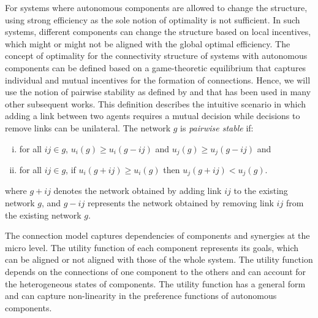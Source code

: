 \documentclass[journal,onecolumn]{IEEEtran}
\theoremstyle{plain}
\begin{document}
For systems where autonomous components are allowed to change the structure, using strong efficiency as the sole notion of optimality is not sufficient. In such systems, different components can change the structure based on local incentives, which might or might not be aligned with the global optimal efficiency. The concept of optimality for the connectivity structure of systems with autonomous components can be defined based on a game-theoretic equilibrium that captures individual and mutual incentives for the formation of connections. Hence, we will use the notion of pairwise stability as defined by \cite{jackson1996strategic} and that has been used in many other subsequent works. This definition describes the intuitive scenario in which adding a link between two agents requires a mutual decision while decisions to remove links can be unilateral.
The network $g$ is \textit{pairwise stable} if:

\begin{enumerate}[(i)]
\item for all $ij \in g$, $u_i(g) \geq u_i(g - ij)$ and $u_j(g) \geq u_j(g - ij)$ and
\item for all $ij \in g$, if $u_i(g + ij) \geq u_i(g)$ then $u_j(g + ij) < u_j(g)$.
\end{enumerate}

where $g+ij$ denotes the network obtained by adding link $ij$ to the existing network $g$, and $g-ij$ represents the network obtained by removing link $ij$ from the existing network $g$.



The connection model captures dependencies of components and synergies at the micro level. The utility function of each component represents its goals, which can be aligned or not aligned with those of the whole system. The utility function depends on the connections of one component to the others and can account for the heterogeneous states of components. The utility function has a general form and can capture non-linearity in the preference functions of autonomous components. 
\end{document}
